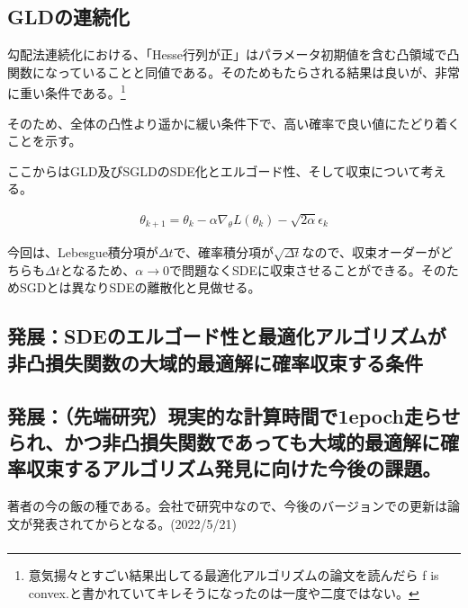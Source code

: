 \documentclass{jsarticle}
\begin{document}
\subsection{GLDの連続化}

勾配法連続化における、「Hesse行列が正」はパラメータ初期値を含む凸領域で凸関数になっていることと同値である。そのためもたらされる結果は良いが、非常に重い条件である。\footnote{意気揚々とすごい結果出してる最適化アルゴリズムの論文を読んだら f is convex.と書かれていてキレそうになったのは一度や二度ではない。}

そのため、全体の凸性より遥かに緩い条件下で、高い確率で良い値にたどり着くことを示す。


ここからはGLD及びSGLDのSDE化とエルゴード性、そして収束について考える。

\begin{align}
\theta_{k+1}=\theta_k-\alpha\nabla_\theta L(\theta_k)-\sqrt{2\alpha}\epsilon_k
\end{align}

今回は、Lebesgue積分項が$\Delta t$で、確率積分項が$\sqrt{\Delta t}$なので、収束オーダーがどちらも$\Delta t$となるため、$\alpha\to0$で問題なくSDEに収束させることができる。そのためSGDとは異なりSDEの離散化と見做せる。








\subsection{発展：SDEのエルゴード性と最適化アルゴリズムが非凸損失関数の大域的最適解に確率収束する条件}






\subsection{発展：（先端研究）現実的な計算時間で1epoch走らせられ、かつ非凸損失関数であっても大域的最適解に確率収束するアルゴリズム発見に向けた今後の課題。}

著者の今の飯の種である。会社で研究中なので、今後のバージョンでの更新は論文が発表されてからとなる。(2022/5/21)








\subsubsection{}
\newpage
\end{document}
